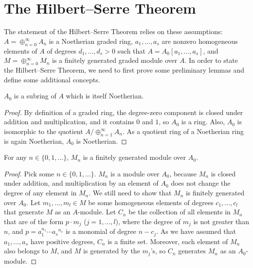 \chapter{The Hilbert--Serre Theorem}\label{HilbertSerre}

The statement of the Hilbert--Serre Theorem relies on these assumptions: $A=\oplus_{n=0}^{\infty}{A}_n$ is a Noetherian graded ring, $a_1,\ldots,a_s$ are nonzero homogeneous elements of $A$ of degrees $d_1,\ldots,d_s>0$ such that $A=A_0[a_1,\ldots,a_s]$, and $M=\oplus_{n=0}^{\infty}M_n$ is a finitely generated graded module over $A$. In order to state the Hilbert--Serre Theorem, we need to first prove some preliminary lemmas and define some additional concepts.

\begin{lemma}
\label{gradezeroNoering}
\leanok
$A_0$ is a subring of $A$ which is itself Noetherian.
\end{lemma}
\begin{proof}
By definition of a graded ring, the degree-zero component is closed under addition and multiplication, and it contains $0$ and $1$, so $A_0$ is a ring. Also, $A_0$ is isomorphic to the quotient $A/\oplus_{n=1}^{\infty}A_n$. As a quotient ring of a Noetherian ring is again Noetherian, $A_0$ is Noetherian.
\end{proof}

\begin{lemma}
\label{gradeifg}
\leanok
For any $n\in\{0,1,\ldots\}$, $M_n$ is a finitely generated module over $A_0$.
\end{lemma}
\begin{proof}
Pick some $n\in\{0,1,\ldots\}$. $M_n$ is a module over $A_0$, because $M_n$ is closed under addition, and multiplication by an element of $A_0$ does not change the degree of any element in $M_n$. We still need to show that $M_n$ is finitely generated over $A_0$. Let $m_1,\ldots,m_l\in{M}$ be some homogeneous elements of degrees $c_1,\ldots,c_l$ that generate $M$ as an $A$-module. Let $C_n$ be the collection of all elements in $M_n$ that are of the form $p{\cdot}m_j$ ($j=1,\ldots,l$), where the degree of $m_j$ is not greater than $n$, and $p=a_1^{n_1}\cdots{a_s}^{n_s}$ is a monomial of degree $n-c_j$. As we have assumed that $a_1,\ldots,a_s$ have positive degrees, $C_n$ is a finite set. Moreover, each element of $M_n$ also belongs to $M$, and $M$ is generated by the $m_j$'s, so $C_n$ generates $M_n$ as an $A_0$-module.
\end{proof}

